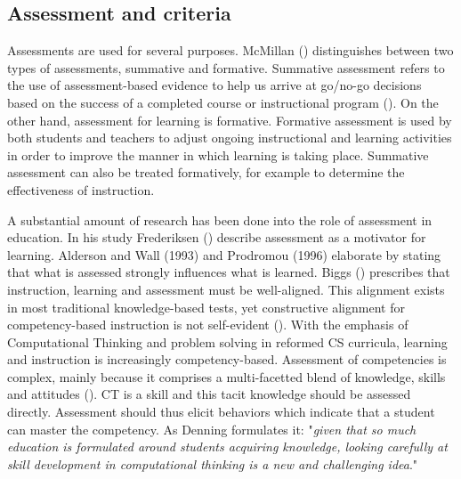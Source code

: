 \subsection{Assessment and criteria}


Assessments are used for several purposes. McMillan (\cite{mcmillan2007formative}) distinguishes between two types of assessments, summative and formative. Summative assessment refers to the use of assessment-based evidence to help us arrive at go/no-go decisions based on the success of a completed course or instructional program (\cite{popham2009assessment}). On the other hand, assessment for learning is formative. Formative assessment is used by both students and teachers to adjust ongoing instructional and learning activities in order to improve the manner in which learning is taking place. Summative assessment can also be treated formatively, for example to determine the effectiveness of instruction.




A substantial amount of research has been done into the role of assessment in education. In his study Frederiksen (\cite{frederiksen1984}) describe assessment as a motivator for learning. Alderson and Wall (1993) and Prodromou (1996) elaborate by stating that what is assessed strongly influences what is learned. Biggs (\cite{biggs1996}) prescribes that instruction, learning and assessment must be well-aligned. This alignment exists in most traditional knowledge-based tests, yet constructive alignment for competency-based instruction is not self-evident (\cite{baartman2006wheel}). With the emphasis of Computational Thinking and problem solving in reformed CS curricula, learning and instruction is increasingly competency-based. Assessment of competencies is complex, mainly because it comprises a multi-facetted blend of knowledge, skills and attitudes (\cite{merrienboer2002competenties}). CT is a skill and this tacit knowledge should be assessed directly\cite{denning2017remaining}. Assessment should thus elicit behaviors which indicate that a student can master the competency. As Denning formulates it: "\emph{given that so much education is formulated around students acquiring knowledge, looking carefully at skill development in computational thinking is a new and challenging idea}."\cite{denning2017remaining}

